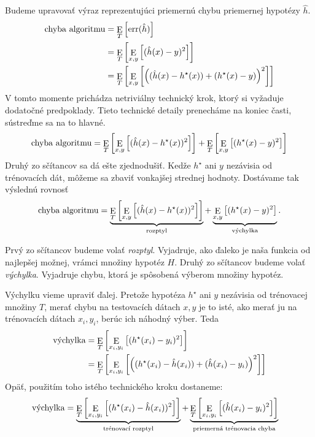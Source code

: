 \documentclass[a4paper,11pt]{article}
\theoremstyle{plain}
\theoremstyle{remark}
\theoremstyle{definition}
\newcommand{\err}{\mathrm{err}}
\DeclareMathOperator*{\E}{\mathrm{E}}
\newcommand{\vychylka}{\text{\normalfont výchylka}}
\newcommand{\chalg}{\text{\normalfont chyba algoritmu}}
\begin{document}
  Budeme upravovať výraz reprezentujúci priemernú chybu priemernej
  hypotézy $\hat{h}$.
  \begin{align}
    \chalg %
      &= \E_T \left[ \err(\hat{h}) \right] \\
      &= \E_T \left[ \E_{x,y} \left[ (\hat{h}(x) - y)^2 \right] \right] \\
      &= \E_T \left[ \E_{x,y} \left[ \left( (\hat{h}(x) - h^\star(x)) + (h^\star(x) - y) \right)^2 \right] \right]
  \end{align}
  V tomto momente prichádza netriviálny technický krok, ktorý si
  vyžaduje dodatočné predpoklady. Tieto technické detaily prenecháme
  na koniec časti, sústreďme sa na to hlavné.
  $$
    \chalg
      = \E_T \left[ \E_{x,y} \left[ (\hat{h}(x) - h^\star(x))^2 \right] \right]
      + \E_T \left[ \E_{x,y} \left[ (h^\star(x) - y)^2 \right] \right]
  $$
  Druhý zo sčítancov sa dá ešte zjednodušiť. Kedže $h^\star$ ani $y$
  nezávisia od trénovacích dát, môžeme sa zbaviť vonkajšej strednej
  hodnoty. Dostávame tak výslednú rovnosť
  $$
    \chalg
      = \underbrace{\E_T \left[ \E_{x,y} \left[ (\hat{h}(x) - h^\star(x))^2 \right] \right]}_{\text{rozptyl}}
      + \underbrace{\E_{x,y} \left[ (h^\star(x) - y)^2 \right]}_{\text{výchylka}}.
  $$
  
  Prvý zo sčítancov budeme volať \emph{rozptyl}. Vyjadruje, ako ďaleko je naša
  funkcia od najlepšej možnej, vrámci množiny hypotéz $H$. Druhý zo sčítancov
  budeme volať \emph{výchylka}. Vyjadruje chybu, ktorá je spôsobená výberom
  množiny hypotéz.
  
  Výchylku vieme upraviť ďalej. Pretože hypotéza $h^\star$ ani $y$ nezávisia od
  trénovacej množiny $T$, merať chybu na testovacích dátach $x, y$ je to
  isté, ako merať ju na trénovacích dátach $x_i, y_i$, berúc ich náhodný
  výber. Teda
  \begin{align}
    \vychylka
      &= \E_T \left[ \E_{x_i, y_i} \left[ (h^\star(x_i) - y_i)^2 \right] \right] \\
      &= \E_T \left[ \E_{x_i, y_i} \left[ \left( (h^\star(x_i) - \hat{h}(x_i)) + (\hat{h}(x_i) - y_i) \right)^2 \right] \right]
  \end{align}
  Opäť, použitím toho istého technického kroku dostaneme:
  \begin{align}
    \vychylka &= \underbrace{\E_T \left[ \E_{x_i, y_i} \left[ (h^\star(x_i) - \hat{h}(x_i))^2 \right] \right]}_{\text{trénovací rozptyl}}
      + \underbrace{\E_T \left[ \E_{x_i, y_i} \left[ (\hat{h}(x_i) - y_i)^2 \right] \right]}_{\text{priemerná trénovacia chyba}}
  \end{align}
  
\end{document}

